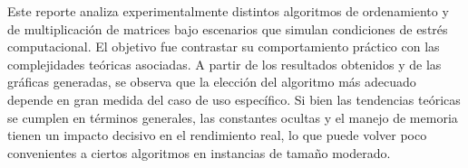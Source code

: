 Este reporte analiza experimentalmente distintos algoritmos de ordenamiento y de multiplicación de matrices bajo escenarios que simulan condiciones de estrés computacional. 
El objetivo fue contrastar su comportamiento práctico con las complejidades teóricas asociadas. 
A partir de los resultados obtenidos y de las gráficas generadas, se observa que la elección del algoritmo más adecuado depende en gran medida del caso de uso específico. 
Si bien las tendencias teóricas se cumplen en términos generales, las constantes ocultas y el manejo de memoria tienen un impacto decisivo en el rendimiento real, 
lo que puede volver poco convenientes a ciertos algoritmos en instancias de tamaño moderado.